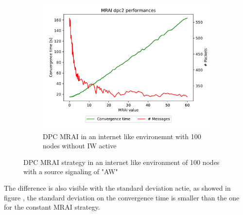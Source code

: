 \documentclass[10pt,conference,letterpaper]{IEEEtran}
\newcommand{\figwidth}{0.78}
\newcommand{\figvspace}{-1.5em}
\begin{document}
\begin{figure}[tb]
	\begin{subfigure}{\columnwidth}
		\centering
		\includegraphics[width=\figwidth\columnwidth]{images/internet_like/S_AW/graph-100-dpc-noIW/pareto-internet_like-DPC-noIW_mrai_evolution.pdf}
		\caption{\ac{DPC} \ac{MRAI} in an internet like environemnt with \num{100} nodes without IW active}
		\label{fig:s_aw_dpc_mrai_noIW}
		\qquad
	\end{subfigure}

	\caption{\ac{DPC} \ac{MRAI} strategy in an internet like environment of \num{100} nodes
			 with a source signaling of "AW"}
	\label{fig:s_aw_dpc_mrai}
	\vspace{\figvspace}
\end{figure}

The difference is also visible with the standard deviation actie, as showed in
figure , the standard deviation on the convergence time
is smaller than the one for the constant \ac{MRAI} strategy.
\end{document}
